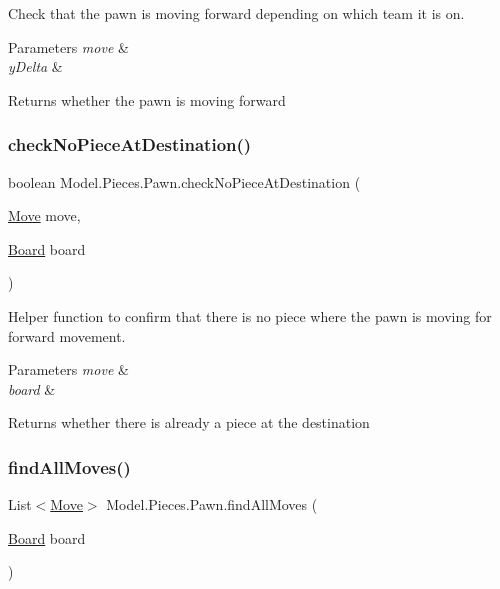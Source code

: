 Check that the pawn is moving forward depending on which team it is on. 
\begin{DoxyParams}{Parameters}
{\em move} & \\
\hline
{\em y\+Delta} & \\
\hline
\end{DoxyParams}
\begin{DoxyReturn}{Returns}
whether the pawn is moving forward 
\end{DoxyReturn}
\hypertarget{class_model_1_1_pieces_1_1_pawn_aa344255a52a7a231c6580caf9c411c1d}{}\label{class_model_1_1_pieces_1_1_pawn_aa344255a52a7a231c6580caf9c411c1d} 
\subsubsection{\texorpdfstring{check\+No\+Piece\+At\+Destination()}{checkNoPieceAtDestination()}}
{\footnotesize\ttfamily boolean Model.\+Pieces.\+Pawn.\+check\+No\+Piece\+At\+Destination (\begin{DoxyParamCaption}\item[{\hyperlink{class_model_1_1_move}{Move}}]{move,  }\item[{\hyperlink{class_model_1_1_board}{Board}}]{board }\end{DoxyParamCaption})}

Helper function to confirm that there is no piece where the pawn is moving for forward movement. 
\begin{DoxyParams}{Parameters}
{\em move} & \\
\hline
{\em board} & \\
\hline
\end{DoxyParams}
\begin{DoxyReturn}{Returns}
whether there is already a piece at the destination 
\end{DoxyReturn}
\hypertarget{class_model_1_1_pieces_1_1_pawn_a95dcb404b5207a813149c152d3a48a50}{}\label{class_model_1_1_pieces_1_1_pawn_a95dcb404b5207a813149c152d3a48a50} 
\subsubsection{\texorpdfstring{find\+All\+Moves()}{findAllMoves()}}
{\footnotesize\ttfamily List$<$\hyperlink{class_model_1_1_move}{Move}$>$ Model.\+Pieces.\+Pawn.\+find\+All\+Moves (\begin{DoxyParamCaption}\item[{\hyperlink{class_model_1_1_board}{Board}}]{board }\end{DoxyParamCaption})}

